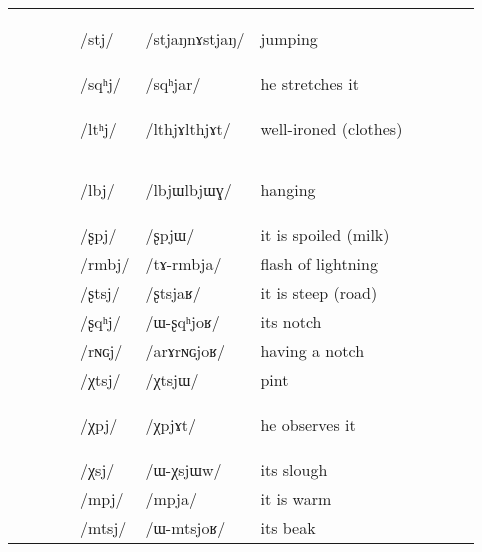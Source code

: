 \documentclass[oneside,a4paper,11pt]{article}
\newcommand{\ipa}[1]{\mbox{\phon/#1/}}
\newcommand{\trois}[1]{\ipa{#1}\addtocounter{3clusters}{1}}
\newcommand{\tib}[1]{\cellcolor{lightgray}\textbf{#1}}
\newcommand{\idph}[1]{\cellcolor{gray}\textbf{#1}}
\newcommand{\resetcounters}[2]{
\newcounter{#1}
\newcounter{#2}
 \setcounter{#1}{\value{2clusters}}
  \setcounter{#2}{\value{3clusters}}
 \setcounter{2clusters}{0}
  \setcounter{3clusters}{0}
}
\begin{document}
\begin{table}
{\begin{tabular}{l|lll|lll|lll|l}
 		 		& 		&		&		&\trois{stj}  \idph{}		&\ipa{stjaŋnɤstjaŋ} 		&jumping \\
 		& 		&		&		&\trois{sqʰj} 		&\ipa{sqʰjar} 		& he stretches it\\
\midrule										
 		& 		&		&		&\trois{ltʰj}  \idph{}		&\ipa{lthjɤlthjɤt} 		&well-ironed (clothes)\\
 		& 		&		&		&\trois{lbj} \idph{}		&\ipa{lbjɯlbjɯɣ} 		&hanging\\
\midrule												
 		& 		&		&		&\trois{ʂpj} 		&\ipa{ʂpjɯ} 		&it is spoiled (milk)\\
 		& 		&		&		&\trois{rmbj} 		&\ipa{tɤ-rmbja} 		&flash of lightning\\
 		& 		&		&		&\trois{ʂtsj} 		&\ipa{ʂtsjaʁ} 		&it is steep (road)\\
 		& 		&		&		&\trois{ʂqʰj} 		&\ipa{ɯ-ʂqʰjoʁ} 		&its notch\\
 		& 		&		&		&\trois{rɴɢj} 		&\ipa{arɤrɴɢjoʁ} 		&having a notch\\
\midrule												
 		& 		&		&		&\trois{χtsj} 		&\ipa{χtsjɯ} 		&pint\\
 		& 		&		&		&\trois{χpj} \tib{}		&\ipa{χpjɤt} 		&he  observes it\\
 		& 		&		&		&\trois{χsj} 		&\ipa{ɯ-χsjɯw} 		&its slough \\
\midrule												
 		& 		&		&		&\trois{mpj} 		&\ipa{mpja} 		&it is warm\\
 		& 		&		&		&\trois{mtsj} 		&\ipa{ɯ-mtsjoʁ} 		&its beak\\
\bottomrule
\end{tabular}}
\end{table}
  \resetcounters{2Cjw}{3Cjw} %
   
\end{document}
